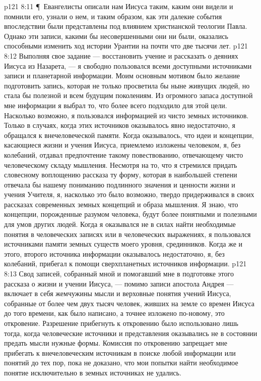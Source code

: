\vs p121 8:11 \P\ Евангелисты описали нам Иисуса таким, каким они видели и помнили его, узнали о нем, и таким образом, как эти далекие события впоследствии были представлены под влиянием христианской теологии Павла. Однако эти записи, какими бы несовершенными они ни были, оказались способными изменить ход истории Урантии на почти что две тысячи лет.
\vs p121 8:12  Выполняя свое задание --- восстановить учение и рассказать о деяниях Иисуса из Назарета, --- я свободно пользовался всеми доступными источниками записи и планетарной информации. Моим основным мотивом было желание подготовить запись, которая не только просветила бы ныне живущих людей, но стала бы полезной и всем будущим поколениям. Из огромного запаса доступной мне информации я выбрал то, что более всего подходило для этой цели. Насколько возможно, я пользовался информацией из чисто земных источников. Только в случаях, когда этих источников оказывалось явно недостаточно, я обращался к внечеловеческой памяти. Когда оказывалось, что идеи и концепции, касающиеся жизни и учения Иисуса, приемлемо изложены человеком, я, без колебаний, отдавал предпочтение такому повествованию, отвечающему чисто человеческому складу мышления. Несмотря на то, что я стремился придать словесному воплощению рассказа ту форму, которая в наибольшей степени отвечала бы нашему пониманию подлинного значения и ценности жизни и учения Учителя, я, насколько это было возможно, твердо придерживался в своих рассказах современных земных концепций и образа мышления. Я знаю, что концепции, порожденные разумом человека, будут более понятными и полезными для умов других людей. Когда я оказывался не в силах найти необходимые понятия в человеческих записях или в человеческих выражениях, я пользовался источниками памяти земных существ моего уровня, срединников. Когда же и этого, второго источника информации оказывалось недостаточно, я, без колебаний, прибегал к помощи сверхпланетных источников информации.
\vs p121 8:13 Свод записей, собранный мной и помогавший мне в подготовке этого рассказа о жизни и учении Иисуса, --- помимо записи апостола Андрея --- включает в себя жемчужины мысли и верховные понятия учений Иисуса, собранные от более чем двух тысяч человек, живших на земле со времен Иисуса до того времени, как было написано, а точнее изложено по\hyp{}новому, это откровение. Разрешение прибегнуть к откровению было использовано лишь тогда, когда человеческие источники и представления оказывались не в состоянии предать мысли нужные формы. Комиссия по откровению запрещает мне прибегать к внечеловеческим источникам в поиске любой информации или понятий до тех пор, пока не доказано, что мои попытки найти необходимое понятие исключительно в земных источниках не удались.
